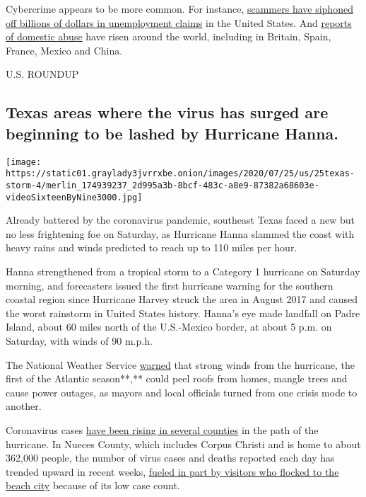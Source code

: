 Cybercrime appears to be more common. For instance,
\href{https://www.nytimes3xbfgragh.onion/2020/07/02/your-money/coronavirus-unemployment-fraud.html}{scammers
have siphoned off billions of dollars in unemployment claims} in the
United States. And
\href{https://www.nytimes3xbfgragh.onion/2020/04/06/world/coronavirus-domestic-violence.html}{reports
of domestic abuse} have risen around the world, including in Britain,
Spain, France, Mexico and China.

U.S. ROUNDUP

\hypertarget{texas-areas-where-the-virus-has-surged-are-beginning-to-be-lashed-by-hurricane-hanna}{%
\subsection{Texas areas where the virus has surged are beginning to be
lashed by Hurricane
Hanna.}\label{texas-areas-where-the-virus-has-surged-are-beginning-to-be-lashed-by-hurricane-hanna}}

\texttt{[image: https://static01.graylady3jvrrxbe.onion/images/2020/07/25/us/25texas-storm-4/merlin\_174939237\_2d995a3b-8bcf-483c-a8e9-87382a68603e-videoSixteenByNine3000.jpg]}

Already battered by the coronavirus pandemic, southeast Texas faced a
new but no less frightening foe on Saturday, as Hurricane Hanna slammed
the coast with heavy rains and winds predicted to reach up to 110 miles
per hour.

Hanna strengthened from a tropical storm to a Category 1 hurricane on
Saturday morning, and forecasters issued the first hurricane warning for
the southern coastal region since Hurricane Harvey struck the area in
August 2017 and caused the worst rainstorm in United States history.
Hanna's eye made landfall on Padre Island, about 60 miles north of the
U.S.-Mexico border, at about 5 p.m. on Saturday, with winds of 90 m.p.h.

The National Weather Service
\href{https://forecast.weather.gov/showsigwx.php?warnzone=TXZ242\&warncounty=TXC273\&firewxzone=TXZ242\&local_place1=3\%20Miles\%20NNE\%20Kingsville,\%20Naval\%20Air\%20Station\%20TX\&product1=Hurricane+Warning\#.XxxWW55KjIV}{warned}
that strong winds from the hurricane, the first of the Atlantic
season**,** could peel roofs from homes, mangle trees and cause power
outages, as mayors and local officials turned from one crisis mode to
another.

Coronavirus cases
\href{https://www.nytimes3xbfgragh.onion/interactive/2020/us/texas-coronavirus-cases.html}{have
been rising in several counties} in the path of the hurricane. In Nueces
County, which includes Corpus Christi and is home to about 362,000
people, the number of virus cases and deaths reported each day has
trended upward in recent weeks,
\href{https://www.nytimes3xbfgragh.onion/2020/07/11/us/coronavirus-texas-corpus-christi.html?smid=tw-nytimes\&smtyp=cur}{fueled
in part by visitors who flocked to the beach city} because of its low
case count.

